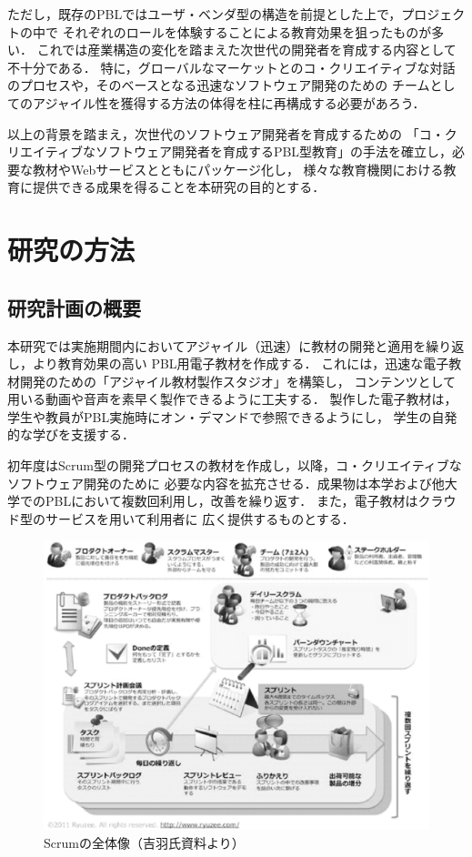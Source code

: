 \documentclass[a4j,9pt,twoside,twocolumn]{jsarticle}
\begin{document}
    ただし，既存のPBLではユーザ・ベンダ型の構造を前提とした上で，プロジェクトの中で
    それぞれのロールを体験することによる教育効果を狙ったものが多い．
    これでは産業構造の変化を踏まえた次世代の開発者を育成する内容として不十分である．
    特に，グローバルなマーケットとのコ・クリエイティブな対話のプロセスや，そのベースとなる迅速なソフトウェア開発のための
    チームとしてのアジャイル性を獲得する方法の体得を柱に再構成する必要があろう．
    
    以上の背景を踏まえ，次世代のソフトウェア開発者を育成するための
    「コ・クリエイティブなソフトウェア開発者を育成するPBL型教育」の手法を確立し，必要な教材やWebサービスとともにパッケージ化し，
    様々な教育機関における教育に提供できる成果を得ることを本研究の目的とする．

\section{研究の方法}\label{sec:method}
\subsection{研究計画の概要}
	本研究では実施期間内においてアジャイル（迅速）に教材の開発と適用を繰り返し，より教育効果の高い
	PBL用電子教材を作成する．
	これには，迅速な電子教材開発のための「アジャイル教材製作スタジオ」を構築し，
	コンテンツとして用いる動画や音声を素早く製作できるように工夫する．
	製作した電子教材は，学生や教員がPBL実施時にオン・デマンドで参照できるようにし，
	学生の自発的な学びを支援する．

	初年度はScrum型の開発プロセスの教材を作成し，以降，コ・クリエイティブなソフトウェア開発のために
	必要な内容を拡充させる．成果物は本学および他大学でのPBLにおいて複数回利用し，改善を繰り返す．
	また，電子教材はクラウド型のサービスを用いて利用者に
	広く提供するものとする．

\begin{figure}
\begin{center}
\includegraphics[width=\linewidth]{figs/scrum.eps}
\caption{Scrumの全体像（吉羽氏資料より）}
\label{fig:scrum}
\end{center}
\end{figure}	
\end{document}
